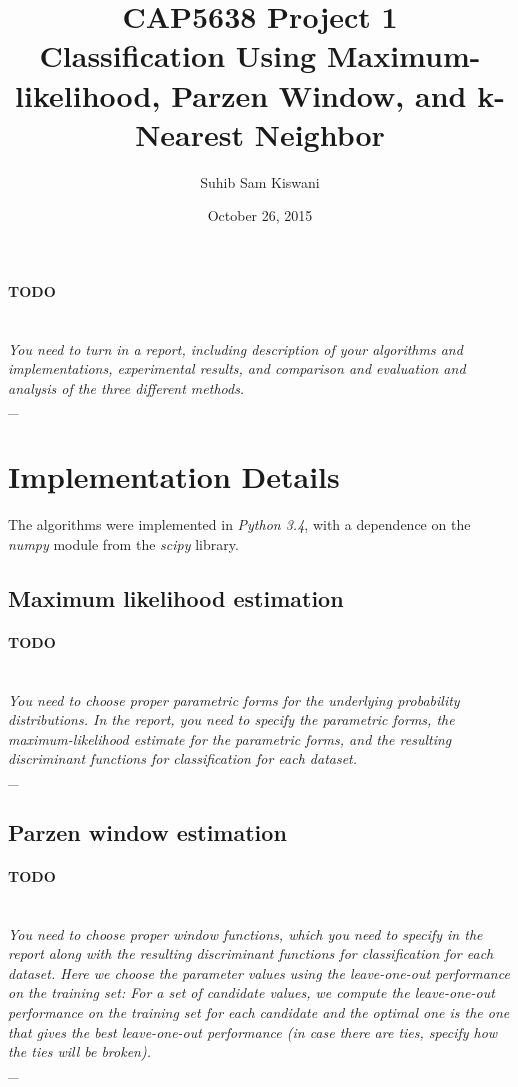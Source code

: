 \documentclass{article}
\title{
    CAP5638 Project 1\\
    \large Classification Using Maximum-likelihood, Parzen Window, and k-Nearest Neighbor
}
\author{Suhib Sam Kiswani}
\date{October 26, 2015}
\newcommand{\outline}[2]{\paragraph{\textsc{#1}}\hrulefill~\\{\small\it #2}\\\_\hrulefill~\\}
\newcommand{\todo}[1]{\outline{\large TODO}{#1}}
\begin{document}
\maketitle

\todo{You need to turn in a report, including description of your algorithms and implementations,
experimental results, and comparison and evaluation and analysis of the three different methods.}


\section{Implementation Details}

The algorithms were implemented in {\it Python 3.4}, with a dependence on the \textit{numpy} module from the \textit{scipy} \cite{sp} library.


\subsection{Maximum likelihood estimation}
\todo{You need to choose proper parametric forms for the underlying probability distributions. In the report, you need to specify the parametric forms, the maximum-likelihood estimate for the parametric forms, and the resulting discriminant functions for classification for each dataset.}


\subsection{Parzen window estimation}
\todo{You need to choose proper window functions, which you need to specify in the report along with the resulting discriminant functions for classification for each dataset. Here we choose the parameter values using the leave-one-out performance on the training set: For a set of candidate values, we compute the leave-one-out performance on the training set for each candidate and the optimal one is the one that gives the best leave-one-out performance (in case there are ties, specify how the ties will be broken).}
\end{document}
